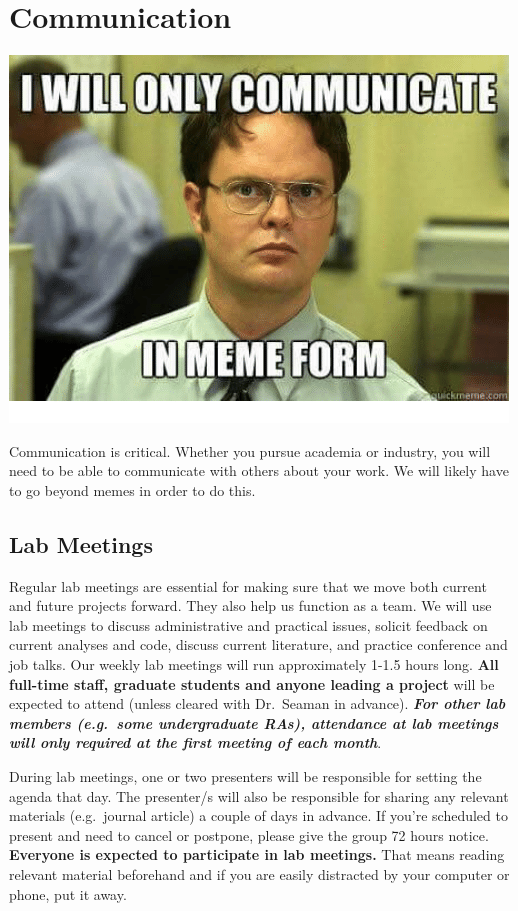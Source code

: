 \documentclass[
]{book}
\begin{document}
\hypertarget{communication}{%
\chapter{Communication}\label{communication}}

\includegraphics{images/communication.png}

Communication is critical. Whether you pursue academia or industry, you will need to be able to communicate with others about your work. We will likely have to go beyond memes in order to do this.

\hypertarget{lab-meetings}{%
\section{Lab Meetings}\label{lab-meetings}}

Regular lab meetings are essential for making sure that we move both current and future projects forward. They also help us function as a team. We will use lab meetings to discuss administrative and practical issues, solicit feedback on current analyses and code, discuss current literature, and practice conference and job talks. Our weekly lab meetings will run approximately 1-1.5 hours long. \textbf{All full-time staff, graduate students and anyone leading a project} will be expected to attend (unless cleared with Dr.~Seaman in advance). \textbf{\emph{For other lab members (e.g.~some undergraduate RAs), attendance at lab meetings will only required at the first meeting of each month}}.

During lab meetings, one or two presenters will be responsible for setting the agenda that day. The presenter/s will also be responsible for sharing any relevant materials (e.g.~journal article) a couple of days in advance. If you're scheduled to present and need to cancel or postpone, please give the group 72 hours notice. \textbf{Everyone is expected to participate in lab meetings.} That means reading relevant material beforehand and if you are easily distracted by your computer or phone, put it away.
\end{document}
